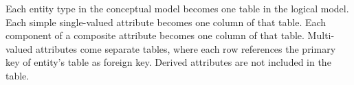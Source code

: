 %
\label{sec:mappingEntitiesToTables}%
%
Each entity type in the conceptual model becomes one table in the logical model.
Each simple single-valued attribute becomes one column of that table.
Each component of a composite attribute becomes one column of that table.
Multi-valued attributes come separate tables, where each row references the primary key of entity's table as foreign key.
Derived attributes are not included in the table.%
%
\FloatBarrier%
\endhsection%
%
